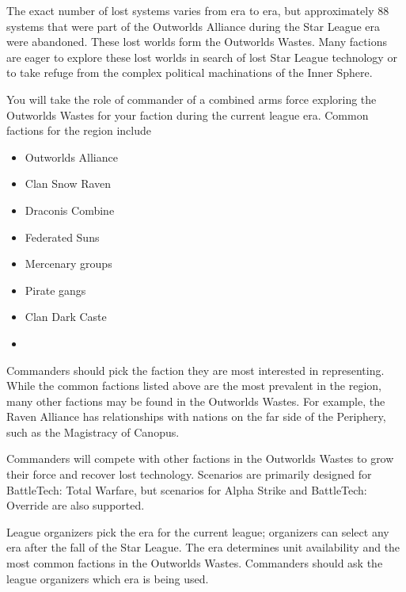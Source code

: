 \documentclass{article}
\begin{document}
The exact number of lost systems varies from era to era, but approximately 88 systems that were part of the Outworlds Alliance during the Star League era were abandoned.
These lost worlds form the Outworlds Wastes.
Many factions are eager to explore these lost worlds in search of lost Star League technology or to take refuge from the complex political machinations of the Inner Sphere.

You will take the role of commander of a combined arms force exploring the Outworlds Wastes for your faction during the current league era.
Common factions for the region include

\begin{multicols}{2}

\begin{itemize}

\item Outworlds Alliance

\item Clan Snow Raven

\item Draconis Combine

\item Federated Suns

\item Mercenary groups

\item Pirate gangs

\item Clan Dark Caste

\item[\vspace{\fill}]

\end{itemize}

\end{multicols}

Commanders should pick the faction they are most interested in representing.
While the common factions listed above are the most prevalent in the region, many other factions may be found in the Outworlds Wastes.
For example, the Raven Alliance has relationships with nations on the far side of the Periphery, such as the Magistracy of Canopus.

Commanders will compete with other factions in the Outworlds Wastes to grow their force and recover lost technology.
Scenarios are primarily designed for BattleTech: Total Warfare, but scenarios for Alpha Strike and BattleTech: Override are also supported.

League organizers pick the era for the current league; organizers can select any era after the fall of the Star League.
The era determines unit availability and the most common factions in the Outworlds Wastes.
Commanders should ask the league organizers which era is being used.
\end{document}
